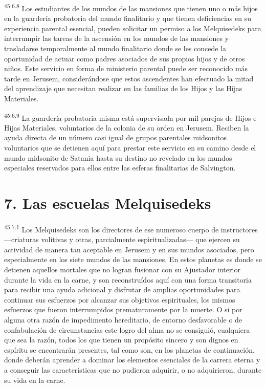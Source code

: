 \par
\textsuperscript{45:6.8} Los estudiantes de los mundos de las mansiones que tienen uno o más hijos en la guardería probatoria del mundo finalitario y que tienen deficiencias en su experiencia parental esencial, pueden solicitar un permiso a los Melquisedeks para interrumpir las tareas de la ascensión en los mundos de las mansiones y trasladarse temporalmente al mundo finalitario donde se les concede la oportunidad de actuar como padres asociados de sus propios hijos y de otros niños. Este servicio en forma de ministerio parental puede ser reconocido más tarde en Jerusem, considerándose que estos ascendentes han efectuado la mitad del aprendizaje que necesitan realizar en las familias de los Hijos y las Hijas Materiales.

\par
\textsuperscript{45:6.9} La guardería probatoria misma está supervisada por mil parejas de Hijos e Hijas Materiales, voluntarios de la colonia de su orden en Jerusem. Reciben la ayuda directa de un número casi igual de grupos parentales midsonitos voluntarios que se detienen aquí para prestar este servicio en su camino desde el mundo midsonito de Satania hasta su destino no revelado en los mundos especiales reservados para ellos entre las esferas finalitarias de Salvington.

\section*{7. Las escuelas Melquisedeks}
\par
\textsuperscript{45:7.1} Los Melquisedeks son los directores de ese numeroso cuerpo de instructores ---criaturas volitivas y otras, parcialmente espiritualizadas--- que ejercen su actividad de manera tan aceptable en Jerusem y en sus mundos asociados, pero especialmente en los siete mundos de las mansiones. En estos planetas es donde se detienen aquellos mortales que no logran fusionar con su Ajustador interior durante la vida en la carne, y son reconstruídos aquí con una forma transitoria para recibir una ayuda adicional y disfrutar de amplias oportunidades para continuar sus esfuerzos por alcanzar sus objetivos espirituales, los mismos esfuerzos que fueron interrumpidos prematuramente por la muerte. O si por alguna otra razón de impedimento hereditario, de entorno desfavorable o de confabulación de circunstancias este logro del alma no se consiguió, cualquiera que sea la razón, todos los que tienen un propósito sincero y son dignos en espíritu se encontrarán presentes, tal como son, en los planetas de continuación, donde deberán aprender a dominar los elementos esenciales de la carrera eterna y a conseguir las características que no pudieron adquirir, o no adquirieron, durante su vida en la carne.

